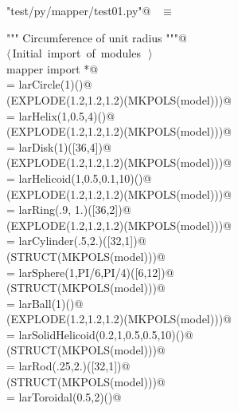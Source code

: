 \documentclass[11pt,oneside]{article}	%
\begin{document}
\begin{flushleft} \small \label{scrap47}
\verb@"test/py/mapper/test01.py"@\nobreak\ {\footnotesize {} }$\equiv$
\vspace{-1ex}
\begin{list}{}{} \item
\mbox{}\verb@""" Circumference of unit radius """@\\
\mbox{}\verb@@\hbox{$\langle\,$Initial import of modules\nobreak\ {\footnotesize {}}$\,\rangle$}\verb@@\\
\mbox{}\verb@from mapper import *@\\
\mbox{}\verb@model = larCircle(1)()@\\
\mbox{}\verb@VIEW(EXPLODE(1.2,1.2,1.2)(MKPOLS(model)))@\\
\mbox{}\verb@model = larHelix(1,0.5,4)()@\\
\mbox{}\verb@VIEW(EXPLODE(1.2,1.2,1.2)(MKPOLS(model)))@\\
\mbox{}\verb@model = larDisk(1)([36,4])@\\
\mbox{}\verb@VIEW(EXPLODE(1.2,1.2,1.2)(MKPOLS(model)))@\\
\mbox{}\verb@model = larHelicoid(1,0.5,0.1,10)()@\\
\mbox{}\verb@VIEW(EXPLODE(1.2,1.2,1.2)(MKPOLS(model)))@\\
\mbox{}\verb@model = larRing(.9, 1.)([36,2])@\\
\mbox{}\verb@VIEW(EXPLODE(1.2,1.2,1.2)(MKPOLS(model)))@\\
\mbox{}\verb@model = larCylinder(.5,2.)([32,1])@\\
\mbox{}\verb@VIEW(STRUCT(MKPOLS(model)))@\\
\mbox{}\verb@model = larSphere(1,PI/6,PI/4)([6,12])@\\
\mbox{}\verb@VIEW(STRUCT(MKPOLS(model)))@\\
\mbox{}\verb@model = larBall(1)()@\\
\mbox{}\verb@VIEW(EXPLODE(1.2,1.2,1.2)(MKPOLS(model)))@\\
\mbox{}\verb@model = larSolidHelicoid(0.2,1,0.5,0.5,10)()@\\
\mbox{}\verb@VIEW(STRUCT(MKPOLS(model)))@\\
\mbox{}\verb@model = larRod(.25,2.)([32,1])@\\
\mbox{}\verb@VIEW(STRUCT(MKPOLS(model)))@\\
\mbox{}\verb@model = larToroidal(0.5,2)()@\\

\end{list}
\end{flushleft}
\end{document}
